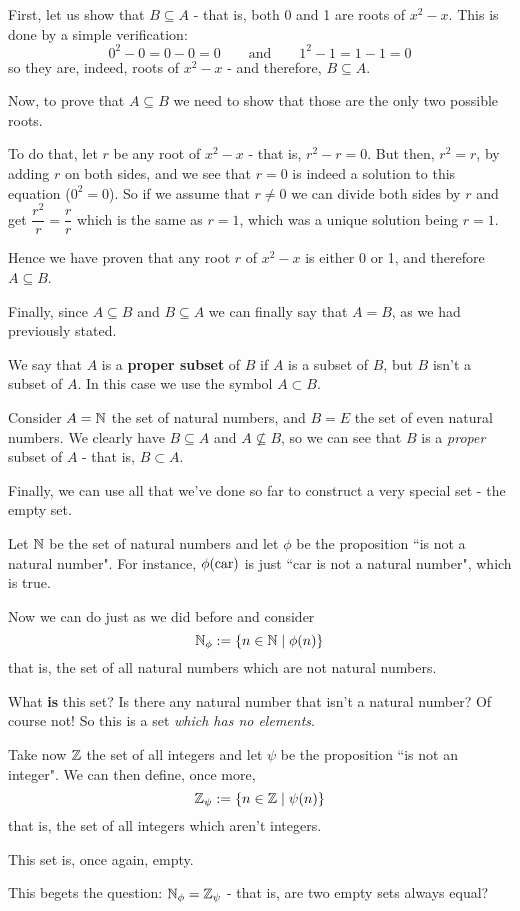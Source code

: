 \begin{ex}
First, let us show that $B\subseteq A$ - that is, both 0 and 1 are roots of $x^2-x$. This is done by a simple verification:
\[0^2-0=0-0=0\quad\quad\mbox{and}\quad\quad 1^2-1=1-1=0\]so they are, indeed, roots of $x^2-x$ - and therefore, $B\subseteq A$.

Now, to prove that $A\subseteq B$ we need to show that those are the only two possible roots.

To do that, let $r$ be any root of $x^2-x$ - that is, $r^2-r=0$. But then, $r^2=r$, by adding $r$ on both sides, and we see that $r=0$ is indeed a solution to this equation ($0^2=0$). So if we assume that $r\neq0$ we can divide both sides by $r$ and get $\dfrac{r^2}{r}=\dfrac{r}{r}$ which is the same as $r=1$, which was a unique solution being $r=1$.

Hence we have proven that any root $r$ of $x^2-x$ is either 0 or 1, and therefore $A\subseteq B$.

Finally, since $A\subseteq B$ and $B\subseteq A$ we can finally say that $A=B$, as we had previously stated.
\end{ex}

\begin{df}
	We say that $A$ is a \textbf{proper subset} of $B$ if $A$ is a subset of $B$, but $B$ isn't a subset of $A$. In this case we use the symbol $A\subset B$.
\end{df}

\begin{ex}
	Consider $A=\mathbb N$ the set of natural numbers, and $B=E$ the set of even natural numbers. We clearly have $B\subseteq A$ and $A\not\subseteq B$, so we can see that $B$ is a \textit{proper} subset of $A$ - that is, $B\subset A$.
\end{ex}

Finally, we can use all that we've done so far to construct a very special set - the empty set.

\begin{ex}
	Let $\mathbb N$ be the set of natural numbers and let $\phi$ be the proposition ``is not a natural number". For instance, $\phi({\rm car})$ is just ``car is not a natural number", which is true.
	
	Now we can do just as we did before and consider
	\[\mathbb N_\phi:=\{n\in\mathbb N\mid \phi(n)\}\]that is, the set of all natural numbers which are not natural numbers.
	
	What \textbf{is} this set? Is there any natural number that isn't a natural number? Of course not! So this is a set \textit{which has no elements}.
	
	Take now $\mathbb{Z}$ the set of all integers and let $\psi$ be the proposition ``is not an integer". We can then define, once more,
	\[\mathbb{Z}_\psi:=\{n\in\mathbb{Z}\mid\psi(n)\}\]that is, the set of all integers which aren't integers.
	
	This set is, once again, empty.
	
	This begets the question: $\mathbb N_\phi=\mathbb{Z}_\psi$ - that is, are two empty sets always equal?
\end{ex}

